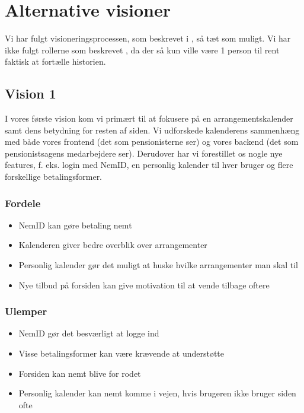 \section{Alternative visioner}
Vi har fulgt visioneringsprocessen, som beskrevet i \cite[Kapitel 11]{Holtzblatt2005}, så tæt som muligt. Vi har ikke fulgt rollerne som beskrevet \cite[s. 214-216]{Holtzblatt2005}, da der så kun ville være 1 person til rent faktisk at fortælle historien. 


\subsection{Vision 1}
I vores første vision kom vi primært til at fokusere på en arrangementskalender samt dens betydning for resten af siden.
Vi udforskede kalenderens sammenhæng med både vores frontend (det som pensionisterne ser) og vores backend (det som pensionistsagens medarbejdere ser).
Derudover har vi forestillet os nogle nye features, f. eks. login med NemID, en personlig kalender til hver bruger og flere forskellige betalingsformer.

\subsubsection{Fordele}
\begin{itemize}
\item NemID kan gøre betaling nemt 
\item Kalenderen giver bedre overblik over arrangementer
\item Personlig kalender gør det muligt at huske hvilke arrangementer man skal til
\item Nye tilbud på forsiden kan give motivation til at vende tilbage oftere
\end{itemize}

\subsubsection{Ulemper}
\begin{itemize}
\item NemID gør det besværligt at logge ind
\item Visse betalingsformer kan være krævende at understøtte
\item Forsiden kan nemt blive for rodet
\item Personlig kalender kan nemt komme i vejen, hvis brugeren ikke bruger siden ofte
\end{itemize}

